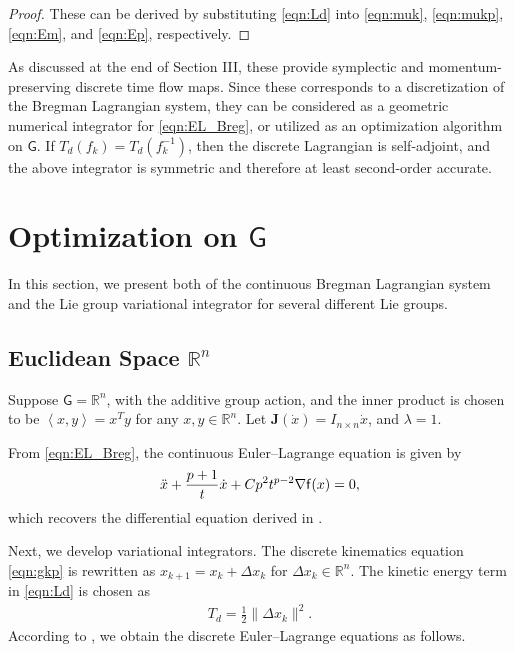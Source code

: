 \documentclass[letterpaper, 10pt, conference]{ieeeconf}
\newcommand{\G}{\ensuremath{\mathsf{G}}}
\renewcommand{\Re}{\ensuremath{\mathbb{R}}}
\newcommand{\pair}[1]{\ensuremath{\left\langle #1 \right\rangle}}
\begin{document}
\begin{proof}
    These can be derived by substituting \eqref{eqn:Ld} into \eqref{eqn:muk}, \eqref{eqn:mukp}, \eqref{eqn:Em}, and \eqref{eqn:Ep}, respectively. 
\end{proof}
As discussed at the end of Section III, these provide symplectic and momentum-preserving discrete time flow maps.
Since these corresponds to a discretization of the Bregman Lagrangian system, they can be considered as a geometric numerical integrator for \eqref{eqn:EL_Breg}, or utilized as an optimization algorithm on $\G$.
If $T_d(f_k)=T_d(f_k^{-1})$, then the discrete Lagrangian is self-adjoint, and the above integrator is symmetric and therefore at least second-order accurate.

\section{Optimization on $\G$}

In this section, we present both of the continuous Bregman Lagrangian system and the Lie group variational integrator for several different Lie groups.

\subsection{Euclidean Space $\Re^n$}

Suppose $\G=\Re^n$, with the additive group action, and the inner product is chosen to be $\pair{x,y}=x^Ty$ for any $x,y\in\Re^n$.
Let $\mathbf{J}(\dot x) = I_{n\times n} \dot x$, and $\lambda =1$. 

From \eqref{eqn:EL_Breg}, the continuous Euler--Lagrange equation is given by
\begin{align}
    \ddot x + \frac{p+1}{t} \dot x + Cp^2 t^{p-2} \nabla \mathsf{f}(x) = 0,\label{eqn:EL_Re}
\end{align}
which recovers the differential equation derived in \cite{wibisono2016variational}.

Next, we develop variational integrators. 
The discrete kinematics equation \eqref{eqn:gkp} is rewritten as $x_{k+1} = x_k + \Delta x_k$ for $\Delta x_k\in\Re^n$.
The kinetic energy term in \eqref{eqn:Ld} is chosen as
\begin{align*}
    T_d =\frac{1}{2}\|\Delta x_k\|^2.
\end{align*}
According to , we obtain the discrete Euler--Lagrange equations as follows.
\end{document}
